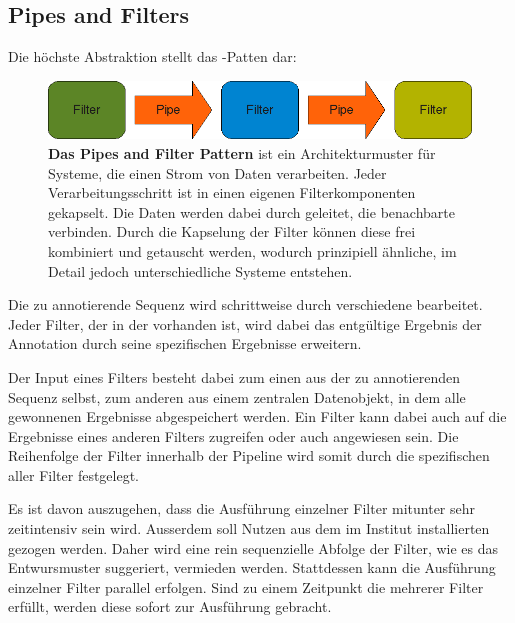 \subsection{Pipes and Filters} \label{chp:pipes and filters}
Die höchste Abstraktion stellt das -Patten dar:

\begin{figure}[htbp]
	\begin{center}
		\includegraphics[scale=0.7]{pics/pipesFilter3.png}
	\caption[Pipes and Filter]{
	\textbf{Das Pipes and Filter Pattern}
	ist ein Architekturmuster für Systeme, die einen Strom von Daten verarbeiten.
	Jeder Verarbeitungsschritt ist in einen eigenen Filterkomponenten gekapselt.
	Die Daten werden dabei durch  geleitet, die benachbarte
	 verbinden.
	Durch die Kapselung der Filter können diese frei kombiniert und
	getauscht werden, wodurch prinzipiell ähnliche, im Detail jedoch
	unterschiedliche Systeme entstehen.
	\citep{buschmann_pattern-oriented_1996}}
	\end{center}
	\label{fig:pipesFilter}
\end{figure}

Die zu annotierende Sequenz wird schrittweise durch verschiedene 
bearbeitet. Jeder Filter, der in der  vorhanden ist, wird dabei
das entgültige Ergebnis der Annotation durch seine spezifischen Ergebnisse
erweitern.

Der Input eines Filters besteht dabei zum einen aus der zu
annotierenden Sequenz selbst, zum anderen aus einem zentralen Datenobjekt, in
dem alle gewonnenen Ergebnisse abgespeichert werden.
Ein Filter kann dabei auch auf die Ergebnisse eines anderen
Filters zugreifen oder auch angewiesen sein.
Die Reihenfolge der Filter innerhalb der Pipeline wird
somit durch die spezifischen  \citep{beck_patterns_1994}
aller Filter festgelegt.

Es ist davon auszugehen, dass die Ausführung einzelner Filter mitunter sehr
zeitintensiv sein wird. Ausserdem soll Nutzen aus dem im Institut installierten
  gezogen werden. Daher wird eine rein
sequenzielle Abfolge der Filter, wie es das Entwursmuster suggeriert, vermieden werden.
Stattdessen kann die Ausführung einzelner Filter parallel erfolgen.
Sind zu einem Zeitpunkt die  mehrerer Filter erfüllt,
werden diese sofort zur Ausführung gebracht.

